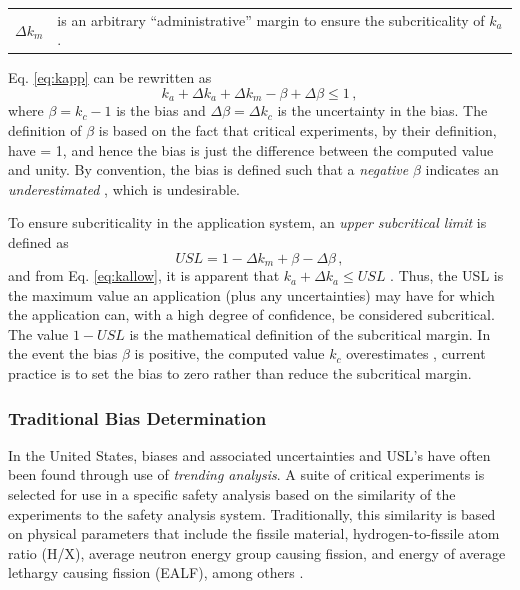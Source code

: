 \begin{tabular}{rp{12cm}}
 $\Delta k_m$    & is an arbitrary ``administrative'' 
                   margin to ensure the subcriticality 
                   of $k_a$. \\
\end{tabular}

Eq. \ref{eq:kapp} can be rewritten as
\begin{equation}
 k_a + \Delta k_a + \Delta k_m - \beta + \Delta \beta \leq 1 \, ,
\label{eq:kallow}
\end{equation}
where $\beta = k_c - 1$ is the bias and $\Delta \beta = \Delta k_c$ is the 
uncertainty in the bias.  The definition of $\beta$ is based on the fact 
that critical experiments, by their definition, have \keff = 1, and hence 
the bias is just the difference between the computed value and unity.  By 
convention, the bias is defined such that a \textit{ negative} $\beta$ 
indicates an \textit{ underestimated} \keff\!, which is undesirable.

To ensure subcriticality in the application system, an \textit{ upper 
subcritical limit} is defined as
\begin{equation}
 USL = 1 - \Delta k_m + \beta - \Delta \beta \, ,
\label{eq:usl}
\end{equation}
and from Eq. \ref{eq:kallow}, it is apparent that $k_a + \Delta k_a \leq USL$ 
\cite{lichtenwalter1997cbg}.   Thus, the USL is the maximum value an 
application \keff (plus any uncertainties) may have for which the 
application can, with a high degree of confidence, be considered 
subcritical.  The value $1 - USL$  is the mathematical definition of the 
subcritical margin.  In the event the bias $\beta$ is positive, \ie the 
computed value $k_c$ overestimates \keff\!, current practice is to set 
the bias to zero rather than reduce the subcritical margin.


\subsubsection{Traditional Bias Determination}

In the United States, biases and associated uncertainties and USL's have 
often been found through use of \textit{ trending analysis}.  A suite of 
critical experiments is selected for use in a specific safety analysis 
based on the similarity of the experiments to the safety analysis system.  
Traditionally, this similarity is based on physical parameters that include 
the fissile material, hydrogen-to-fissile atom ratio (H/X), average neutron 
energy group causing fission, and energy of average lethargy causing 
fission (EALF), among others \cite{broadhead2004sau}.

